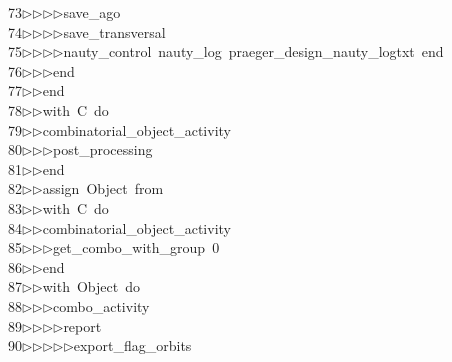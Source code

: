 \begin{tabbing}
73\>$\triangleright$\>$\triangleright$\>$\triangleright$\>$\triangleright$\>save\_ago\ \\[0pt]
74\>$\triangleright$\>$\triangleright$\>$\triangleright$\>$\triangleright$\>save\_transversal\ \\[0pt]
75\>$\triangleright$\>$\triangleright$\>$\triangleright$\>$\triangleright$\>nauty\_control\ nauty\_log\ praeger\_design\_nauty\_logtxt\ end\ \\[0pt]
76\>$\triangleright$\>$\triangleright$\>$\triangleright$\>end\ \\[0pt]
77\>$\triangleright$\>$\triangleright$\>end\ \\[0pt]
78\>$\triangleright$\>$\triangleright$\>with\ C\ do\ \\[0pt]
79\>$\triangleright$\>$\triangleright$\>combinatorial\_object\_activity\ \\[0pt]
80\>$\triangleright$\>$\triangleright$\>$\triangleright$\>post\_processing\ \\[0pt]
81\>$\triangleright$\>$\triangleright$\>end\ \\[0pt]
82\>$\triangleright$\>$\triangleright$\>assign\ Object\ from\ \\[0pt]
83\>$\triangleright$\>$\triangleright$\>with\ C\ do\ \\[0pt]
84\>$\triangleright$\>$\triangleright$\>combinatorial\_object\_activity\ \\[0pt]
85\>$\triangleright$\>$\triangleright$\>$\triangleright$\>get\_combo\_with\_group\ 0\ \\[0pt]
86\>$\triangleright$\>$\triangleright$\>end\ \\[0pt]
87\>$\triangleright$\>$\triangleright$\>with\ Object\ do\ \\[0pt]
88\>$\triangleright$\>$\triangleright$\>$\triangleright$\>combo\_activity\ \\[0pt]
89\>$\triangleright$\>$\triangleright$\>$\triangleright$\>$\triangleright$\>report\ \\[0pt]
90\>$\triangleright$\>$\triangleright$\>$\triangleright$\>$\triangleright$\>$\triangleright$\>export\_flag\_orbits\ \\[0pt]

\end{tabbing}
